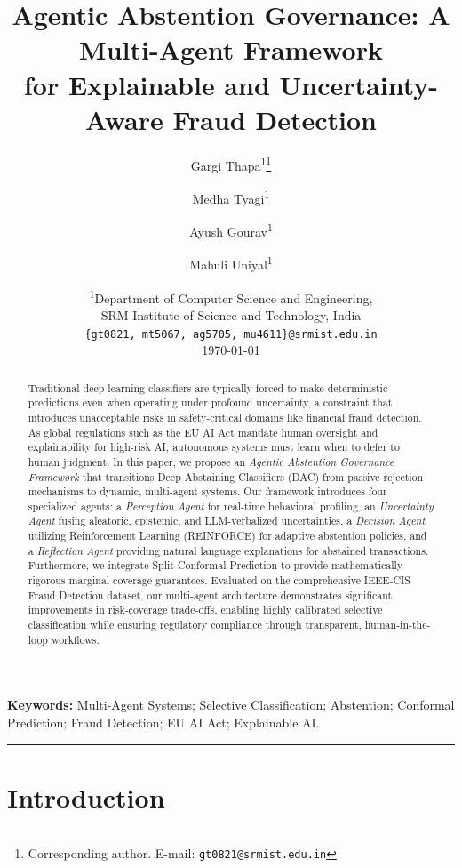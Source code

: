 \documentclass[12pt,a4paper]{article}
\title{\textbf{Agentic Abstention Governance: A Multi-Agent Framework\\
for Explainable and Uncertainty-Aware Fraud Detection}}
\author{
  Gargi Thapa\textsuperscript{1}\thanks{Corresponding author. E-mail: \texttt{gt0821@srmist.edu.in}} \and
  Medha Tyagi\textsuperscript{1} \and
  Ayush Gourav\textsuperscript{1} \and
  Mahuli Uniyal\textsuperscript{1}
}
\date{%
  \textsuperscript{1}Department of Computer Science and Engineering,\\
  SRM Institute of Science and Technology, India\\[4pt]
  \small\texttt{\{gt0821, mt5067, ag5705, mu4611\}@srmist.edu.in}\\[8pt]
  \today
}
\begin{document}
\maketitle

\begin{abstract}
Traditional deep learning classifiers are typically forced to make deterministic
predictions even when operating under profound uncertainty, a constraint that
introduces unacceptable risks in safety-critical domains like financial fraud
detection. As global regulations such as the EU AI Act mandate human oversight
and explainability for high-risk AI, autonomous systems must learn when to defer
to human judgment. In this paper, we propose an \textit{Agentic Abstention
Governance Framework} that transitions Deep Abstaining Classifiers (DAC) from
passive rejection mechanisms to dynamic, multi-agent systems. Our framework
introduces four specialized agents: a \textit{Perception Agent} for real-time
behavioral profiling, an \textit{Uncertainty Agent} fusing aleatoric, epistemic,
and LLM-verbalized uncertainties, a \textit{Decision Agent} utilizing
Reinforcement Learning (REINFORCE) for adaptive abstention policies, and a
\textit{Reflection Agent} providing natural language explanations for abstained
transactions. Furthermore, we integrate Split Conformal Prediction to provide
mathematically rigorous marginal coverage guarantees. Evaluated on the
comprehensive IEEE-CIS Fraud Detection dataset, our multi-agent architecture
demonstrates significant improvements in risk-coverage trade-offs, enabling
highly calibrated selective classification while ensuring regulatory compliance
through transparent, human-in-the-loop workflows.
\end{abstract}

\noindent\textbf{Keywords:} Multi-Agent Systems; Selective Classification;
Abstention; Conformal Prediction; Fraud Detection; EU AI Act; Explainable AI.

\bigskip
\hrule
\bigskip

\section{Introduction}
\label{sec:introduction}
\end{document}
